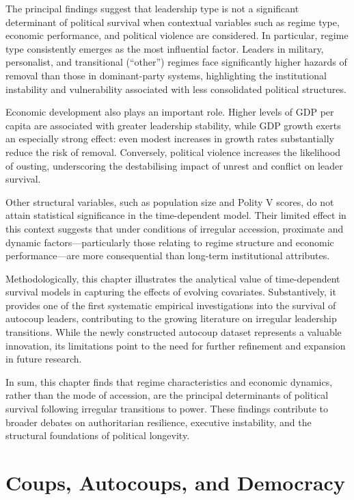 \documentclass[
  12pt,
]{report}
\begin{document}
The principal findings suggest that leadership type is not a significant
determinant of political survival when contextual variables such as
regime type, economic performance, and political violence are
considered. In particular, regime type consistently emerges as the most
influential factor. Leaders in military, personalist, and transitional
(``other'') regimes face significantly higher hazards of removal than
those in dominant-party systems, highlighting the institutional
instability and vulnerability associated with less consolidated
political structures.

Economic development also plays an important role. Higher levels of GDP
per capita are associated with greater leadership stability, while GDP
growth exerts an especially strong effect: even modest increases in
growth rates substantially reduce the risk of removal. Conversely,
political violence increases the likelihood of ousting, underscoring the
destabilising impact of unrest and conflict on leader survival.

Other structural variables, such as population size and Polity V scores,
do not attain statistical significance in the time-dependent model.
Their limited effect in this context suggests that under conditions of
irregular accession, proximate and dynamic factors---particularly those
relating to regime structure and economic performance---are more
consequential than long-term institutional attributes.

Methodologically, this chapter illustrates the analytical value of
time-dependent survival models in capturing the effects of evolving
covariates. Substantively, it provides one of the first systematic
empirical investigations into the survival of autocoup leaders,
contributing to the growing literature on irregular leadership
transitions. While the newly constructed autocoup dataset represents a
valuable innovation, its limitations point to the need for further
refinement and expansion in future research.

In sum, this chapter finds that regime characteristics and economic
dynamics, rather than the mode of accession, are the principal
determinants of political survival following irregular transitions to
power. These findings contribute to broader debates on authoritarian
resilience, executive instability, and the structural foundations of
political longevity.

\chapter{Coups, Autocoups, and
Democracy}\label{coups-autocoups-and-democracy}
\end{document}
